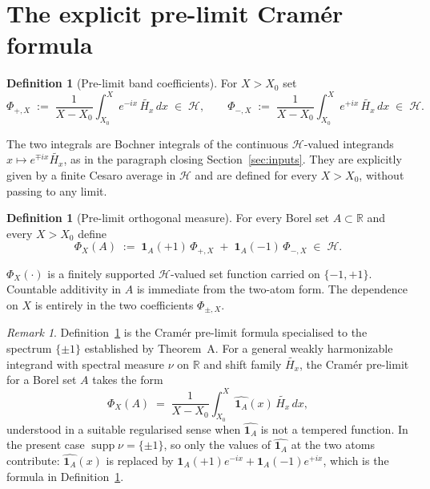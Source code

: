 \documentclass[11pt]{article}
\theoremstyle{definition}
\newtheorem{definition}[theorem]{Definition}
\theoremstyle{remark}
\newtheorem{remark}[theorem]{Remark}
\DeclareMathOperator{\supp}{supp}
\begin{document}
\section{The explicit pre-limit Cram\'er formula}\label{sec:prelimit}

\begin{definition}[Pre-limit band coefficients]\label{def:prelimit-band}
For $X>X_0$ set
\[
  \Phi_{+,X}\;:=\;\frac{1}{X-X_0}\int_{X_0}^X e^{-ix}\,\widetilde{H_x}\,dx\;\in\;\mathcal{H},\qquad
  \Phi_{-,X}\;:=\;\frac{1}{X-X_0}\int_{X_0}^X e^{+ix}\,\widetilde{H_x}\,dx\;\in\;\mathcal{H}.
\]
\end{definition}

The two integrals are Bochner integrals of the continuous $\mathcal{H}$-valued integrands $x\mapsto e^{\mp ix}\widetilde{H_x}$, as in the paragraph closing Section~\ref{sec:inputs}. They are explicitly given by a finite Cesaro average in $\mathcal{H}$ and are defined for every $X>X_0$, without passing to any limit.

\begin{definition}[Pre-limit orthogonal measure]\label{def:prelimit-measure}
For every Borel set $A\subset\mathbb{R}$ and every $X>X_0$ define
\[
  \Phi_X(A)\;:=\;\mathbf{1}_A(+1)\,\Phi_{+,X}\;+\;\mathbf{1}_A(-1)\,\Phi_{-,X}\;\in\;\mathcal{H}.
\]
\end{definition}

$\Phi_X(\cdot)$ is a finitely supported $\mathcal{H}$-valued set function carried on $\{-1,+1\}$. Countable additivity in $A$ is immediate from the two-atom form. The dependence on $X$ is entirely in the two coefficients $\Phi_{\pm,X}$.

\begin{remark}\label{rem:cramer-form}
Definition~\ref{def:prelimit-band} is the Cram\'er pre-limit formula specialised to the spectrum $\{\pm 1\}$ established by Theorem~A. For a general weakly harmonizable integrand with spectral measure $\nu$ on $\mathbb{R}$ and shift family $\widetilde{H_x}$, the Cram\'er pre-limit for a Borel set $A$ takes the form
\[
  \Phi_X(A)\;=\;\frac{1}{X-X_0}\int_{X_0}^X\widehat{\mathbf{1}_A}(x)\,\widetilde{H_x}\,dx,
\]
understood in a suitable regularised sense when $\widehat{\mathbf{1}_A}$ is not a tempered function. In the present case $\supp\nu=\{\pm 1\}$, so only the values of $\widehat{\mathbf{1}_A}$ at the two atoms contribute: $\widehat{\mathbf{1}_A}(x)$ is replaced by $\mathbf{1}_A(+1)e^{-ix}+\mathbf{1}_A(-1)e^{+ix}$, which is the formula in Definition~\ref{def:prelimit-band}.
\end{remark}
\end{document}
